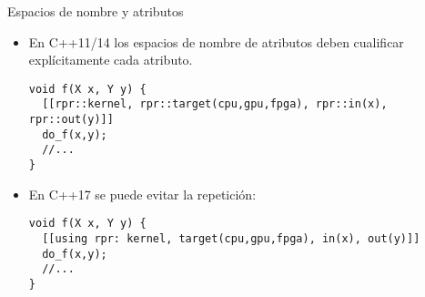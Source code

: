 \begin{frame}[t,fragile]{Espacios de nombre y atributos}
\begin{itemize}
  \item En C++11/14 los espacios de nombre de atributos deben cualificar
        explícitamente cada atributo.
\begin{lstlisting}
void f(X x, Y y) {
  [[rpr::kernel, rpr::target(cpu,gpu,fpga), rpr::in(x), rpr::out(y)]]
  do_f(x,y);
  //...
}
\end{lstlisting}

  \vfill\pause
  \item En C++17 se puede evitar la repetición:
\begin{lstlisting}
void f(X x, Y y) {
  [[using rpr: kernel, target(cpu,gpu,fpga), in(x), out(y)]]
  do_f(x,y);
  //...
}
\end{lstlisting}

\end{itemize}
\end{frame}
